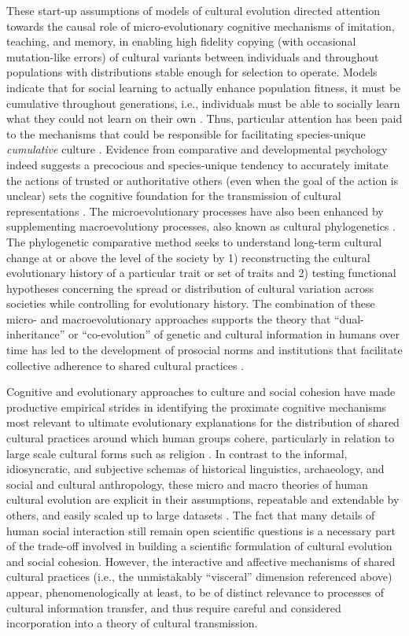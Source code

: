   These start-up assumptions of models of cultural evolution directed attention towards the causal role of micro-evolutionary cognitive mechanisms of imitation, teaching, and memory, in enabling high fidelity copying (with occasional mutation-like errors) of cultural variants between individuals and throughout populations with distributions stable enough for selection to operate.  Models indicate that for social learning to actually enhance population fitness, it must be cumulative throughout generations, i.e., individuals must be able to socially learn what they could not learn on their own \citep{Boyd1995}.  Thus, particular attention has been paid to the mechanisms that could be responsible for facilitating species-unique \textit{cumulative} culture \citep{Tomasello2008}.
  Evidence from comparative and developmental psychology indeed suggests a precocious and species-unique tendency to accurately imitate the actions of trusted or authoritative others (even when the goal of the action is unclear) sets the cognitive foundation for the transmission of cultural representations \citep{Tomasello2014a}.  The microevolutionary processes have also been enhanced by supplementing macroevolutiony processes, also known as cultural phylogenetics \citep{Mace1994}.  The phylogenetic comparative method seeks to understand long-term cultural change at or above the level of the society by 1) reconstructing the cultural evolutionary history of a particular trait or set of traits and 2) testing functional hypotheses concerning the spread or distribution of cultural variation across societies while controlling for evolutionary history.
  The combination of these micro- and macroevolutionary approaches supports the theory that  ``dual-inheritance'' or ``co-evolution'' of genetic and cultural information in humans over time has led to the development of prosocial norms and institutions that facilitate collective adherence to shared cultural practices \citep{Richerson2008,Chudek2011}.

  Cognitive and evolutionary approaches to culture and social cohesion have made productive empirical strides in identifying the proximate cognitive mechanisms most relevant to ultimate evolutionary explanations for the distribution of shared cultural practices around which human groups cohere, particularly in relation to large scale cultural forms such as religion \citep{Henrich2015,Purzycki2016b}.  In contrast to the informal, idiosyncratic, and subjective schemas of historical linguistics, archaeology, and social and cultural anthropology, these micro and macro theories of human cultural evolution are explicit in their assumptions, repeatable and extendable by others, and easily scaled up to large datasets \citep{Mesoudi2017}. The fact that many details of human social interaction still remain open scientific questions is a necessary part of the trade-off involved in building a scientific formulation of cultural evolution and social cohesion. However, the interactive and affective mechanisms of shared cultural practices (i.e., the unmistakably ``visceral'' dimension referenced above) appear, phenomenologically at least, to be of distinct relevance to processes of cultural information transfer, and thus require careful and considered incorporation into a theory of cultural transmission.

